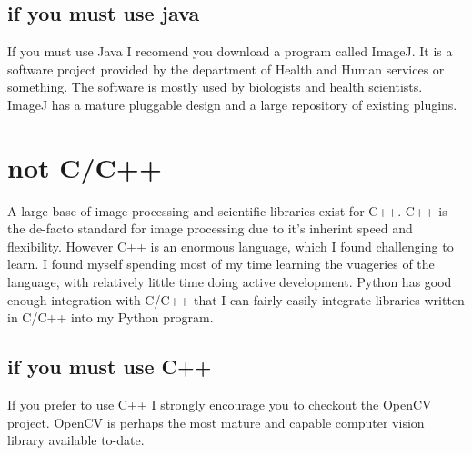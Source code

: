 \subsection{if you must use java}
If you must use Java I recomend you download a program called ImageJ. It is a software project provided by the department of Health and Human services or something.  The software is mostly used by biologists and health scientists. ImageJ has a mature pluggable design and a large repository of existing plugins.

\section{not C/C++}
A large base of image processing and scientific libraries exist for C++. C++ is the de-facto standard for image processing due to it's inherint speed and flexibility. However C++ is an enormous language, which I found challenging to learn. I found myself spending most of my time learning the vuageries of the language, with relatively little time doing active development.  Python has good enough integration with C/C++ that I can fairly easily integrate libraries written in C/C++ into my Python program.

\subsection{if you must use C++}
If you prefer to use C++ I strongly encourage you to checkout the OpenCV project. OpenCV is perhaps the most mature and capable computer vision library  available to-date.

\newpage

